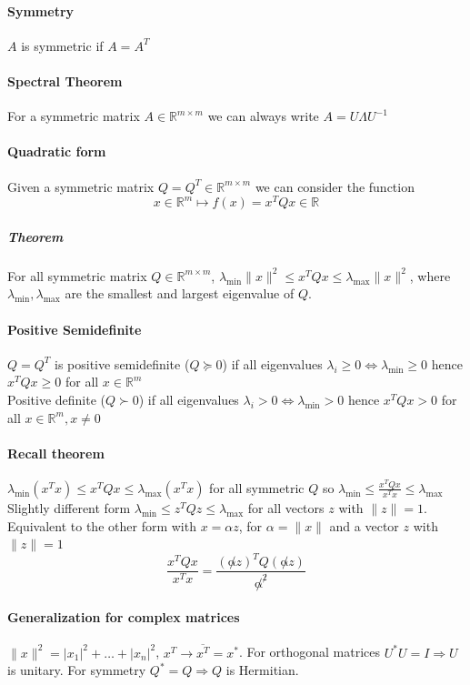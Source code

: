 \documentclass[10pt]{report}
\begin{document}
\paragraph{Symmetry} $A$ is symmetric if $A = A^T$
\paragraph{Spectral Theorem} For a symmetric matrix $A\in \mathbb{R}^{m\times m}$ we can always write $A = U\Lambda U^{-1}$
\paragraph{Quadratic form} Given a symmetric matrix $Q = Q^T \in \mathbb{R}^{m\times m}$ we can consider the function $$x\in \mathbb{R}^m\mapsto f(x) = x^T Qx \in \mathbb{R}$$
\subparagraph{Theorem} For all symmetric matrix $Q \in \mathbb{R}^{m\times m}$, $\lambda_{\min}\|x\|^2 \leq x^TQx\leq \lambda_{\max}\|x\|^2$, where $\lambda_{\min}, \lambda_{\max}$ are the smallest and largest eigenvalue of $Q$.
\paragraph{Positive Semidefinite} $Q = Q^T$ is positive semidefinite ($Q \succeq 0$) if all eigenvalues $\lambda_i \geq 0 \Leftrightarrow \lambda_{\min} \geq 0$ hence $x^T Q x\geq 0$ for all $x\in \mathbb{R}^m$\\
Positive definite ($Q \succ 0$) if all eigenvalues $\lambda_i > 0 \Leftrightarrow \lambda_{\min} > 0$ hence $x^TQx > 0$ for all $x \in \mathbb{R}^m, x\neq 0$
\paragraph{Recall theorem} $\lambda_{\min}(x^T x) \leq x^T Q x \leq \lambda_{\max}(x^T x)$ for all symmetric $Q$ so $\lambda_{\min} \leq \frac{x^T Q x}{x^T x} \leq \lambda_{\max}$\\
Slightly different form $\lambda_{\min} \leq z^T Q z \leq \lambda_{\max}$ for all vectors $z$ with $\|z\| = 1$. Equivalent to the other form with $x = \alpha z$, for $\alpha = \|x\|$ and a vector $z$ with $\|z\| = 1$
$$ \frac{x^T Q x}{x^T x} = \frac{(\not\alpha z)^T Q (\not\alpha z)}{\not\alpha^{\not 2}}$$
\paragraph{Generalization for complex matrices} $\|x\|^2 = |x_1|^2 + \ldots + |x_n|^2$, $x^T \longrightarrow \overline{x^T} = x^*$. For orthogonal matrices $U^*U=I \Rightarrow U$ is unitary. For symmetry $Q^* = Q \Rightarrow Q$ is Hermitian.
\end{document}
